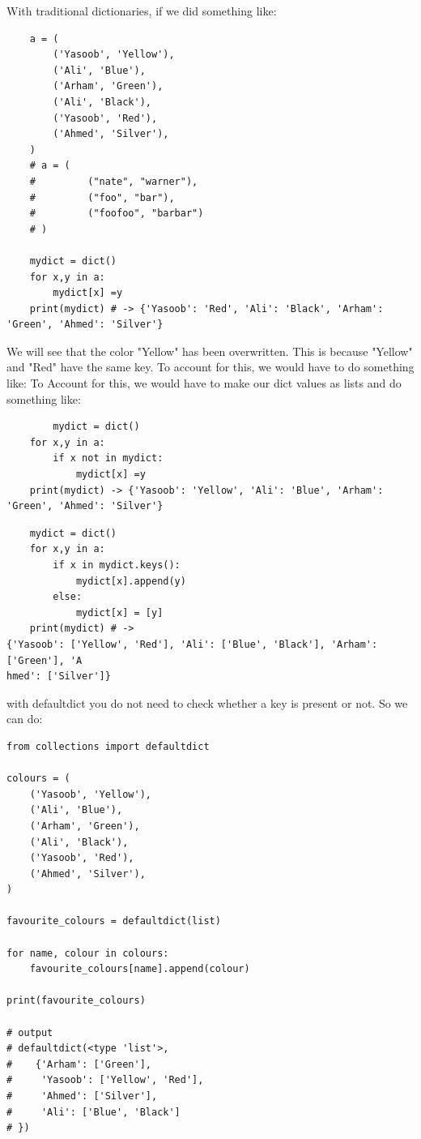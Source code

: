 \documentclass{report}
\begin{document}
    \bigbreak \noindent 
    With traditional dictionaries, if we did something like:
    \begin{verbatim}
    a = (
        ('Yasoob', 'Yellow'),
        ('Ali', 'Blue'),
        ('Arham', 'Green'),
        ('Ali', 'Black'),
        ('Yasoob', 'Red'),
        ('Ahmed', 'Silver'),
    )
    # a = (
    #         ("nate", "warner"),
    #         ("foo", "bar"),
    #         ("foofoo", "barbar")
    # )

    mydict = dict()
    for x,y in a:
        mydict[x] =y
    print(mydict) # -> {'Yasoob': 'Red', 'Ali': 'Black', 'Arham': 'Green', 'Ahmed': 'Silver'}
    \end{verbatim}
    We will see that the color "Yellow" has been overwritten. This is because "Yellow" and "Red" have the same key. To account for this, we would have to do something like:
    \bigbreak \noindent 
    To Account for this, we would have to make our dict values as lists and do something like:
    \begin{verbatim}
        mydict = dict()
    for x,y in a:
        if x not in mydict:
            mydict[x] =y
    print(mydict) -> {'Yasoob': 'Yellow', 'Ali': 'Blue', 'Arham': 'Green', 'Ahmed': 'Silver'}
    \end{verbatim}
    \bigbreak \noindent 
    \begin{verbatim}
    mydict = dict()
    for x,y in a:
        if x in mydict.keys():
            mydict[x].append(y)
        else:
            mydict[x] = [y]
    print(mydict) # ->
{'Yasoob': ['Yellow', 'Red'], 'Ali': ['Blue', 'Black'], 'Arham': ['Green'], 'A
hmed': ['Silver']}
    \end{verbatim}
    with defaultdict you do not need to check whether a key is present or not. So we can do:
    \begin{verbatim}
from collections import defaultdict

colours = (
    ('Yasoob', 'Yellow'),
    ('Ali', 'Blue'),
    ('Arham', 'Green'),
    ('Ali', 'Black'),
    ('Yasoob', 'Red'),
    ('Ahmed', 'Silver'),
)

favourite_colours = defaultdict(list)

for name, colour in colours:
    favourite_colours[name].append(colour)

print(favourite_colours)

# output
# defaultdict(<type 'list'>,
#    {'Arham': ['Green'],
#     'Yasoob': ['Yellow', 'Red'],
#     'Ahmed': ['Silver'],
#     'Ali': ['Blue', 'Black']
# })
    \end{verbatim}
\end{document}
